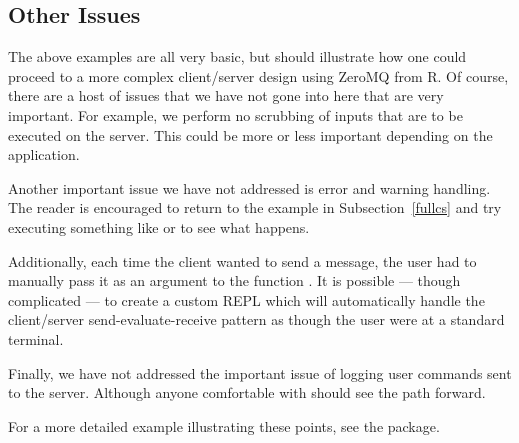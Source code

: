 \subsection{Other Issues}

The above examples are all very basic, but should illustrate how one could
proceed to a more complex client/server design using ZeroMQ from R.  Of course,
there are a host of issues that we have not gone into here that are very 
important.  For example, we perform no scrubbing of inputs that are to be 
executed on the server.  This could be more or less important depending on the
application.  

Another important issue we have not addressed is error and warning handling.
The reader is encouraged to return to the example in Subsection~\ref{fullcs}
and try executing something like 
or
to see what happens.

Additionally, each time the client wanted to send a message,
the user had to manually pass it as an argument to the function 
.  It is possible --- though complicated --- to create a
custom REPL which will automatically handle the client/server 
send-evaluate-receive pattern as though the user were at a standard 
terminal.

Finally, we have not addressed the important issue of logging user commands
sent to the server.  Although anyone comfortable with  should
see the path forward.

For a more detailed example illustrating these points, see the 
package.
